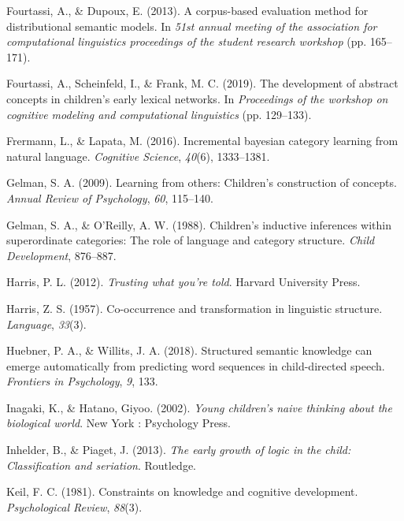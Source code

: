 \documentclass[english,,man,floatsintext]{apa6}
\begin{document}
\leavevmode\hypertarget{ref-fourtassi2013}{}%
Fourtassi, A., \& Dupoux, E. (2013). A corpus-based evaluation method for distributional semantic models. In \emph{51st annual meeting of the association for computational linguistics proceedings of the student research workshop} (pp. 165--171).

\leavevmode\hypertarget{ref-fourtassi2019}{}%
Fourtassi, A., Scheinfeld, I., \& Frank, M. C. (2019). The development of abstract concepts in children's early lexical networks. In \emph{Proceedings of the workshop on cognitive modeling and computational linguistics} (pp. 129--133).

\leavevmode\hypertarget{ref-frermann2016}{}%
Frermann, L., \& Lapata, M. (2016). Incremental bayesian category learning from natural language. \emph{Cognitive Science}, \emph{40}(6), 1333--1381.

\leavevmode\hypertarget{ref-gelman2009}{}%
Gelman, S. A. (2009). Learning from others: Children's construction of concepts. \emph{Annual Review of Psychology}, \emph{60}, 115--140.

\leavevmode\hypertarget{ref-gelman1988}{}%
Gelman, S. A., \& O'Reilly, A. W. (1988). Children's inductive inferences within superordinate categories: The role of language and category structure. \emph{Child Development}, 876--887.

\leavevmode\hypertarget{ref-harris2012}{}%
Harris, P. L. (2012). \emph{Trusting what you're told}. Harvard University Press.

\leavevmode\hypertarget{ref-harris1957}{}%
Harris, Z. S. (1957). Co-occurrence and transformation in linguistic structure. \emph{Language}, \emph{33}(3).

\leavevmode\hypertarget{ref-huebner2018}{}%
Huebner, P. A., \& Willits, J. A. (2018). Structured semantic knowledge can emerge automatically from predicting word sequences in child-directed speech. \emph{Frontiers in Psychology}, \emph{9}, 133.

\leavevmode\hypertarget{ref-inagaki2002}{}%
Inagaki, K., \& Hatano, Giyoo. (2002). \emph{Young children's naive thinking about the biological world}. New York : Psychology Press.

\leavevmode\hypertarget{ref-inhelder2013}{}%
Inhelder, B., \& Piaget, J. (2013). \emph{The early growth of logic in the child: Classification and seriation}. Routledge.

\leavevmode\hypertarget{ref-keil1981}{}%
Keil, F. C. (1981). Constraints on knowledge and cognitive development. \emph{Psychological Review}, \emph{88}(3).
\end{document}

